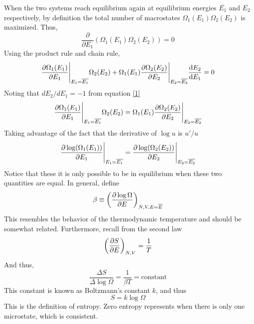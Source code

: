 \documentclass{article}
\begin{document}
\begin{itemize}
\begin{derivation}
        When the two systems reach equilibrium again at equilibrium energies $\overline{E_1}$ and $\overline{E_2}$ respectively, by definition the total number of macrostates $\Omega_1(E_1)\Omega_2(E_2)$ is maximized. Thus,
        \begin{equation}
            \frac{\partial}{\partial E_1}(\Omega_1(E_1)\Omega_2(E_2))=0
        \end{equation}
        Using the product rule and chain rule,
        \begin{equation}
            \partialderivative{\Omega_1(E_1)}{E_1}\Bigg|_{E_1=\overline{E_1}}\Omega_2(E_2)+\Omega_1(E_1)\partialderivative{\Omega_2(E_2)}{E_2}\Bigg|_{E_2=\overline{E_2}}\derivative{E_2}{E_1}=0
        \end{equation}
        Noting that $dE_2/dE_1=-1$ from equation \eqref{1}
        \begin{equation}
            \partialderivative{\Omega_1(E_1)}{E_1}\Bigg|_{E_1=\overline{E_1}}\Omega_2(E_2)=\Omega_1(E_1)\partialderivative{\Omega_2(E_2)}{E_2}\Bigg|_{E_2=\overline{E_2}}
        \end{equation}
        Taking advantage of the fact that the derivative of $\log u$ is $u'/u$
        \begin{equation}
            \partialderivative{\log(\Omega_1(E_1))}{E_1}\Bigg|_{E_1=\overline{E_1}}=\partialderivative{\log(\Omega_2(E_2))}{E_2}\Bigg|_{E_2=\overline{E_2}}
        \end{equation}
        Notice that these it is only possible to be in equilibrium when these two quantities are equal. In general, define
        \begin{equation}
            \beta\equiv\left(\partialderivative{\log\Omega}{E}\right)_{N,V,E=\overline{E}}
        \end{equation} 
        This resembles the behavior of the thermodynamic temperature and should be somewhat related. Furthermore, recall from the second law
        \begin{equation}
            \left(\partialderivative{S}{E}\right)_{N,V}=\frac{1}{T}
        \end{equation}
        And thus,
        \begin{equation}
            \frac{\Delta S}{\Delta \log\Omega}=\frac{1}{\beta T}=\text{constant}
        \end{equation}
        This constant is known as Boltzmann's constant $k$, and thus
        \begin{equation}
            S=k\log\Omega\label{entropy}
        \end{equation}
        This is the definition of entropy. Zero entropy represents when there is only one microstate, which is consistent.   
    \end{derivation}


\end{itemize}
\end{document}
